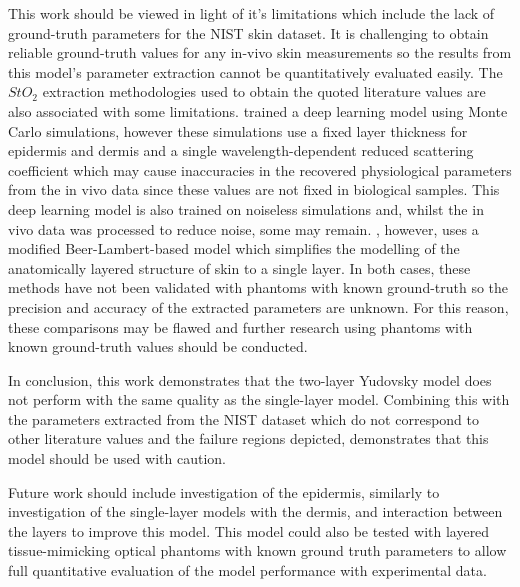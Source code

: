 This work should be viewed in light of it's limitations which include the lack of ground-truth parameters for the NIST skin dataset. It is challenging to obtain reliable ground-truth values for any in-vivo skin measurements so the results from this model's parameter extraction cannot be quantitatively evaluated easily. The $StO_2$ extraction methodologies used to obtain the quoted literature values are also associated with some limitations. \citet{Nishidate2011} trained a deep learning model using Monte Carlo simulations, however these simulations use a fixed layer thickness for epidermis and dermis and a single wavelength-dependent reduced scattering coefficient which may cause inaccuracies in the recovered physiological parameters from the in vivo data since these values are not fixed in biological samples. This deep learning model is also trained on noiseless simulations and, whilst the in vivo data was processed to reduce noise, some may remain. \citet{VanManen2021}, however, uses a modified Beer-Lambert-based model which simplifies the modelling of the anatomically layered structure of skin to a single layer. In both cases, these methods have not been validated with phantoms with known ground-truth so the precision and accuracy of the extracted parameters are unknown. For this reason, these comparisons may be flawed and further research using phantoms with known ground-truth values should be conducted.

In conclusion, this work demonstrates that the two-layer Yudovsky model does not perform with the same quality as the single-layer model. Combining this with the parameters extracted from the NIST dataset which do not correspond to other literature values and the failure regions depicted, demonstrates that this model should be used with caution. 

Future work should include investigation of the epidermis, similarly to investigation of the single-layer models with the dermis, and interaction between the layers to improve this model. This model could also be tested with layered tissue-mimicking optical phantoms with known ground truth parameters to allow full quantitative evaluation of the model performance with experimental data. 

